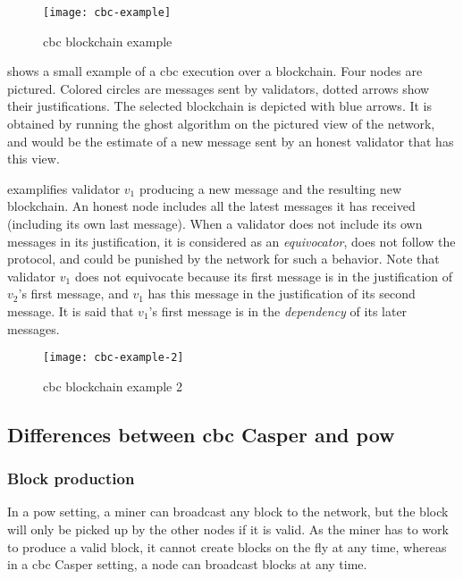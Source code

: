 \begin{figure}[h]
	\centering
	\texttt{[image: cbc-example]}
  \captionsetup{justification=centering}
    \caption{\gls{cbc} blockchain example}
	\label{fig:example}
\end{figure}

 shows a small example of a \gls{cbc} execution
over a blockchain. Four nodes are pictured. Colored circles are messages sent by
validators, dotted arrows show their justifications. The selected blockchain is
depicted with blue arrows. It is obtained by running the \gls{ghost} algorithm
on the pictured view of the network, and would be the estimate of a new message
sent by an honest validator that has this view.

 examplifies validator \(v_1\) producing a new message
and the resulting new blockchain. An honest node includes all the latest
messages it has received (including its own last message). When a validator does
not include its own messages in its justification, it is considered as an
\textit{equivocator}, does not follow the protocol, and could be punished by
the network for such a behavior. Note that validator \(v_1\) does not equivocate
because its first message is in the justification of \(v_2\)'s first message,
and \(v_1\) has this message in the justification of its second message. It is
said that \(v_1\)'s first message is in the \textit{dependency} of its later
messages.

\begin{figure}[h]
	\centering
	\texttt{[image: cbc-example-2]}
  \captionsetup{justification=centering}
    \caption{\gls{cbc} blockchain example 2}
	\label{fig:example2}
\end{figure}

\FloatBarrier
\subsection{Differences between \gls{cbc} Casper and \gls{pow}}
\label{ssec:powVsPos}

\subsubsection{Block production}
In a \gls{pow} setting, a miner can broadcast any block to the network, but the
block will only be picked up by the other nodes if it is valid. As the miner has
to work to produce a valid block, it cannot create blocks on the fly at any
time, whereas in a \gls{cbc} Casper setting, a node can broadcast blocks at any
time. 

